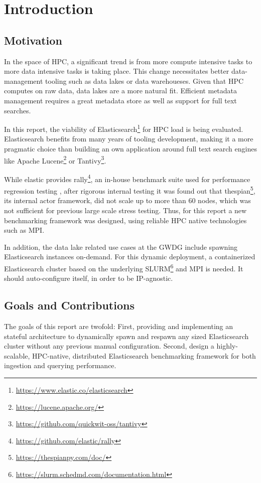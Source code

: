 \section{Introduction}
\subsection{Motivation}
In the space of \ac{HPC}, a significant trend is from more compute intensive tasks to more data intensive tasks is taking place. This change necessitates better data-management tooling such as data lakes or data warehoueses. Given that \ac{HPC} computes on raw data, data lakes are a more natural fit. Efficient metadata management requires a great metadata store as well as support for full text searches.

In this report, the viability of Elasticsearch\footnote{\url{https://www.elastic.co/elasticsearch}} for \ac{HPC} load is being evaluated. Elasticsearch benefits from many years of tooling development, making it a more pragmatic choice than building an own application around full text search engines like Apache Lucene\footnote{\url{https://lucene.apache.org/}} or Tantivy\footnote{\url{https://github.com/quickwit-oss/tantivy}}.

While elastic provides rally\footnote{\url{https://github.com/elastic/rally}}, an in-house benchmark suite used for performance regression testing \cite{es_benchmarking}, after rigorous internal testing it was found out that thespian\footnote{\url{https://thespianpy.com/doc/}}, its internal actor framework, did not scale up to more than 60 nodes, which was not sufficient for previous large scale stress testing. Thus, for this report a new benchmarking framework was designed, using reliable \ac{HPC} native technologies such as \ac{MPI}.

In addition, the data lake related use cases at the GWDG include spawning Elasticsearch instances on-demand. For this dynamic deployment, a containerized Elasticsearch cluster based on the underlying SLURM\footnote{\url{https://slurm.schedmd.com/documentation.html}} and \ac{MPI} is needed. It should auto-configure itself, in order to be IP-agnostic.
\subsection{Goals and Contributions}
The goals of this report are twofold: First, providing and implementing an stateful architecture to dynamically spawn and respawn any sized Elasticsearch cluster without any previous manual configuration. Second, design a highly-scalable, \ac{HPC}-native, distributed Elasticsearch benchmarking framework for both ingestion and querying performance. 

